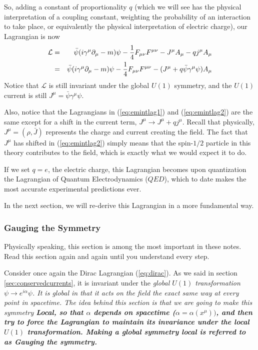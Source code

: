\documentclass[12pt,epsf]{article}
\def\nolabel{\nonumber }
\def\nolabel{\nonumber }
\begin{document}
So, adding a constant of proportionality $q$ (which we will see has the
physical interpretation of a coupling constant, weighting the
probability of an interaction to take place, or equivalently the
physical interpretation of electric charge), our Lagrangian is now
\begin{eqnarray}
\mathcal{L} &=& \bar \psi(i\gamma^{\mu}\partial_{\mu} - m)\psi -
{1\over 4}F_{\mu \nu}F^{\mu \nu} - J^{\mu}A_{\mu} - qj^{\mu}A_{\mu}
\nolabel \\
&=& \bar \psi(i\gamma^{\mu}\partial_{\mu} - m)\psi - {1\over 4}F_{\mu
\nu}F^{\mu \nu} - (J^{\mu} + q\bar \psi \gamma^{\mu} \psi)A_{\mu}
\label{eq:emintlag2}
\end{eqnarray}
Notice that $\mathcal{L}$ is still invariant under the global $U(1)$
symmetry, and the $U(1)$ current is still $J^{\mu} = \bar \psi
\gamma^{\mu} \psi$.  

Also, notice that the Lagrangians in (\ref{eq:emintlag1}) and
(\ref{eq:emintlag2}) are the same except for a shift in the current
term, $J^{\mu} \rightarrow J^{\mu}+qj^{\mu}$.  Recall that physically,
$J^{\mu} = (\rho, \bar J)$ represents the charge and current creating
the field.  The fact that $J^{\mu}$ has shifted in (\ref{eq:emintlag2})
simply means that the spin-$1/2$ particle in this theory contributes to
the field, which is exactly what we would expect it to do.  

If we set $q=e$, the electric charge, this Lagrangian becomes upon
quantization the Lagrangian of Quantum Electrodynamics ($QED$), which
to date makes the most accurate experimental predictions ever.	

In the next section, we will re-derive this Lagrangian in a more
fundamental way.  

\subsubsection{Gauging the Symmetry}
\label{sec:gaugingthesymmetry}

Physically speaking, this section is among the most important in these
notes.	Read this section again and again until you understand every
step.  

Consider once again the Dirac Lagrangian (\ref{eq:dirac}).  As we said
in section \ref{sec:conservedcurrents}, it is invariant under the \it
global \rm $U(1)$ transformation $\psi \rightarrow e^{i\alpha}\psi$. 
It is global in that it acts on the field the exact same way at every
point in spacetime.  The idea behind this section is that we are going
to make this symmetry \bf Local\rm, so that $\alpha$ depends on
spacetime ($\alpha = \alpha(x^{\mu}))$, and then try to force the
Lagrangian to maintain its invariance under the \it local \rm $U(1)$
transformation.  Making a global symmetry local is referred to as \bf
Gauging \rm the symmetry.  
\end{document}
